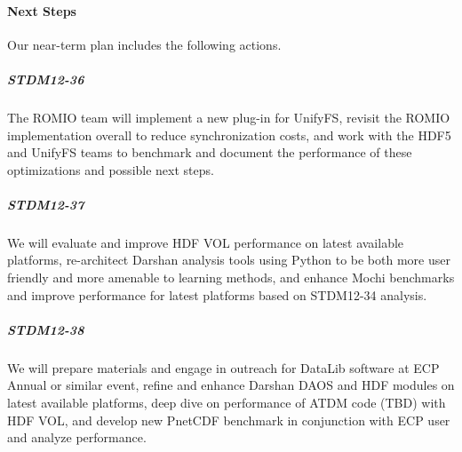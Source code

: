 \paragraph{Next Steps}

Our near-term plan includes the following actions.



\subparagraph{STDM12-36} The ROMIO team will implement a new plug-in for
UnifyFS, revisit the ROMIO implementation overall to reduce
synchronization costs, and work with the HDF5 and UnifyFS teams to
benchmark and document the performance of these optimizations and
possible next steps.

\subparagraph{STDM12-37} We will evaluate and improve HDF VOL performance
on latest available platforms, re-architect Darshan analysis tools
using Python to be both more user friendly and more amenable to
learning methods, and enhance Mochi benchmarks and improve performance
for latest platforms based on STDM12-34 analysis.

\subparagraph{STDM12-38}
We will prepare materials and engage in outreach for DataLib software
at ECP Annual or similar event, refine and enhance Darshan
DAOS and HDF modules on latest available platforms, deep dive
on performance of ATDM code (TBD) with HDF VOL, and develop
new PnetCDF benchmark in conjunction with ECP user and analyze performance.


